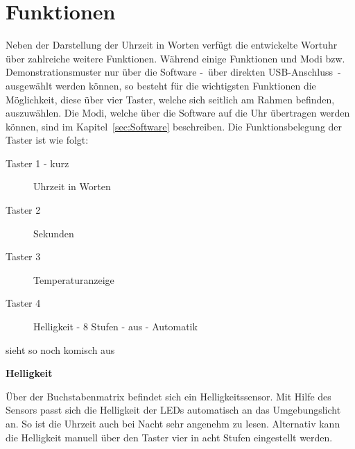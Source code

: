 
\section{Funktionen}
\label{sec:Funktionen}



Neben der Darstellung der Uhrzeit in Worten verfügt die entwickelte Wortuhr über zahlreiche weitere Funktionen. Während einige Funktionen und Modi bzw. Demonstrationsmuster nur über die Software -~über direkten USB-Anschluss~- ausgewählt werden können, so besteht für die wichtigsten Funktionen die Möglichkeit, diese über vier Taster, welche sich seitlich am Rahmen befinden, auszuwählen. Die Modi, welche über die Software auf die Uhr übertragen werden können, sind im Kapitel~\ref{sec:Software} beschreiben. Die Funktionsbelegung der Taster ist wie folgt:

 

\begin{description}

\item[Taster 1 - kurz] Uhrzeit in Worten
\item[Taster 2] Sekunden 
\item[Taster 3] Temperaturanzeige
\item[Taster 4] Helligkeit - 8 Stufen - aus - Automatik

\end {description}
 
 sieht so noch komisch aus


\textbf{Helligkeit}

Über der Buchstabenmatrix befindet sich ein Helligkeitssensor. Mit Hilfe des Sensors passt sich die Helligkeit der LEDs automatisch an das Umgebungslicht an. So ist die Uhrzeit auch bei Nacht sehr angenehm zu lesen. Alternativ kann die Helligkeit manuell über den Taster vier in acht Stufen eingestellt werden.

